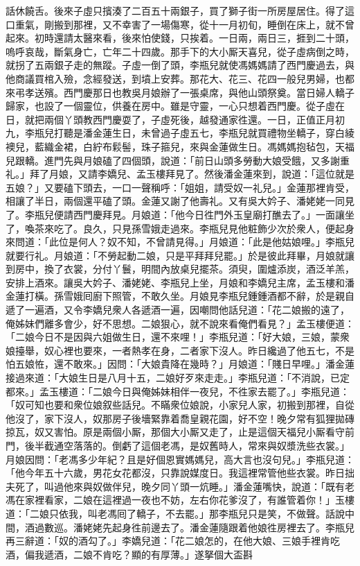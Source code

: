 話休饒舌。後來子虛只擯湊了二百五十兩銀子，買了獅子街一所房屋居住。得了這口重氣，剛搬到那裡，又不幸害了一場傷寒，從十一月初旬，睡倒在床上，就不曾起來。初時還請太醫來看，後來怕使錢，只挨着。一日兩，兩日三，捱到二十頭，嗚呼哀哉，斷氣身亡，亡年二十四歲。{}那手下的大小厮天喜兒，從子虛病倒之時，就拐了五兩銀子走的無蹤。子虛一倒了頭，李瓶兒就使馮媽媽請了西門慶過去，與他商議買棺入殮，念經發送，到墳上安葬。那花大、花三、花四一般兒男婦，也都來弔孝送殯。{}西門慶那日也教吳月娘辦了一張桌席，與他山頭祭奠。當日婦人轎子歸家，也設了一個靈位，供養在房中。雖是守靈，一心只想着西門慶。從子虛在日，就把兩個丫頭教西門慶耍了，子虛死後，越發通家徃還。一日，正值正月初九，李瓶兒打聽是潘金蓮生日，未曾過子虛五七，李瓶兒就買禮物坐轎子，穿白綾襖兒，藍織金裙，白紵布鬏髻，珠子箍兒，來與金蓮做生日。馮媽媽抱毡包，天福兒跟轎。進門先與月娘磕了四個頭，說道：「前日山頭多勞動大娘受餓，又多謝重礼。」拜了月娘，又請李嬌兒、孟玉樓拜見了。然後潘金蓮來到，說道：「這位就是五娘？」{}又要磕下頭去，一口一聲稱呼：「姐姐，{}請受奴一礼兒。」金蓮那裡肯受，相讓了半日，兩個還平磕了頭。金蓮又謝了他壽礼。又有吳大妗子、潘姥姥一同見了。{}李瓶兒便請西門慶拜見。月娘道：「他今日徃門外玉皇廟打醮去了。」一面讓坐了，喚茶來吃了。良久，只見孫雪娥走過來。李瓶兒見他粧飾少次於衆人，便起身來問道：「此位是何人？奴不知，不曾請見得。」月娘道：「此是他姑娘哩。」李瓶兒就要行礼。月娘道：「不勞起動二娘，只是平拜拜兒罷。」於是彼此拜畢，月娘就讓到房中，換了衣裳，分付丫鬟，明間內放桌兒擺茶。須臾，圍爐添炭，酒泛羊羔，安排上酒來。讓吳大妗子、潘姥姥、李瓶兒上坐，月娘和李嬌兒主席，孟玉樓和潘金蓮打橫。孫雪娥囘廚下照管，不敢久坐。月娘見李瓶兒鍾鍾酒都不辭，於是親自遞了一遍酒，又令李嬌兒衆人各遞酒一遍，因嘲問他話兒道：「花二娘搬的遠了，俺姊妹們離多會少，好不思想。二娘狠心，就不說來看俺們看見？」孟玉樓便道：「二娘今日不是因與六姐做生日，還不來哩！」李瓶兒道：「好大娘，三娘，蒙衆娘擡舉，{}奴心裡也要來，一者熱孝在身，二者家下沒人。昨日纔過了他五七，不是怕五娘恠，還不敢來。」因問：「大娘貴降在幾時？」月娘道：「賤日早哩。」潘金蓮接過來道：「大娘生日是八月十五，二娘好歹來走走。」李瓶兒道：「不消說，已定都來。」孟玉樓道：「二娘今日與俺姊妹相伴一夜兒，不徃家去罷了。」李瓶兒道：「奴可知也要和衆位娘叙些話兒。不瞞衆位娘說，小家兒人家，初搬到那裡，自從他沒了，家下沒人，奴那房子後墻緊靠着喬皇親花園，好不空！{}晚夕常有狐狸拋磚掠瓦，奴又害怕。原是兩個小厮，那個大小厮又走了，止是這個天福兒小厮看守前門，後半截通空落落的。倒虧了這個老馮，是奴舊時人，常來與奴漿洗些衣裳。」月娘因問：「老馮多少年紀？且是好個恩實媽媽兒，高大言也沒句兒。」李瓶兒道：「他今年五十六歲，男花女花都沒，只靠說媒度日。我這裡常管他些衣裳。昨日拙夫死了，叫過他來與奴做伴兒，晚夕同丫頭一炕睡。」潘金蓮嘴快，說道：「既有老馮在家裡看家，二娘在這裡過一夜也不妨，左右你花爹沒了，有誰管着你！」{}玉樓道：「二娘只依我，叫老馮囘了轎子，不去罷。」那李瓶兒只是笑，不做聲。{}話說中間，酒過數巡。潘姥姥先起身徃前邊去了。潘金蓮隨跟着他娘徃房裡去了。李瓶兒再三辭道：「奴的酒勾了。」李嬌兒道：「花二娘怎的，在他大娘、三娘手裡肯吃酒，偏我遞酒，二娘不肯吃？顯的有厚薄。」遂拏個大盃斟
